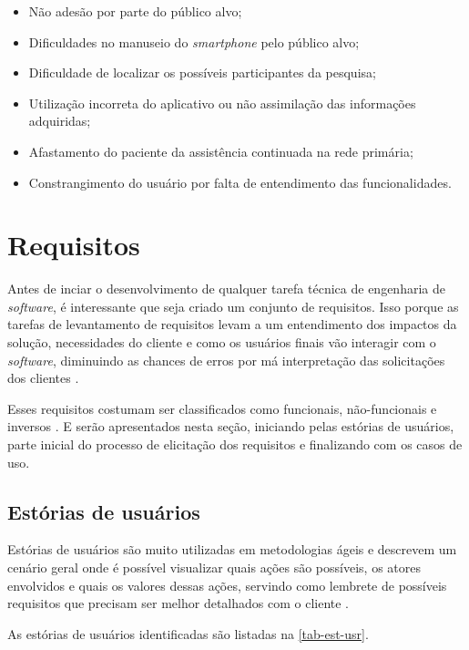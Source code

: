 \begin{itemize}
    \item Não adesão por parte do público alvo;
    \item Dificuldades no manuseio do \emph{smartphone} pelo público alvo;
    \item Dificuldade de localizar os possíveis participantes da pesquisa;
    \item Utilização incorreta do aplicativo ou não assimilação das informações adquiridas;
    \item Afastamento do paciente da assistência continuada na rede primária;
    \item Constrangimento do usuário por falta de entendimento das funcionalidades.
\end{itemize}

\newpage

\section{Requisitos}

Antes de inciar o desenvolvimento de qualquer tarefa técnica de engenharia de \emph{software}, é interessante que seja criado
um conjunto de requisitos.
Isso porque as tarefas de levantamento de requisitos levam a um entendimento dos impactos da solução, necessidades do cliente e
como os usuários finais vão interagir com o \emph{software}, diminuindo as chances de erros por má interpretação das solicitações
dos clientes \cite{pressman2014software}.

Esses requisitos costumam ser classificados como funcionais, não-funcionais e inversos \cite{sommerville2007engenharia}.
E serão apresentados nesta seção, iniciando pelas estórias de usuários, parte inicial do processo de elicitação
dos requisitos e finalizando com os casos de uso.

\newpage

\subsection{Estórias de usuários}

Estórias de usuários são muito utilizadas em metodologias ágeis e descrevem um cenário geral onde é possível visualizar
quais ações são possíveis, os atores envolvidos e quais os valores dessas ações, servindo como lembrete
de possíveis requisitos que precisam ser melhor detalhados com o cliente \cite{nawrocki2014agile}.

As estórias de usuários identificadas são listadas na \autoref{tab-est-usr}.


